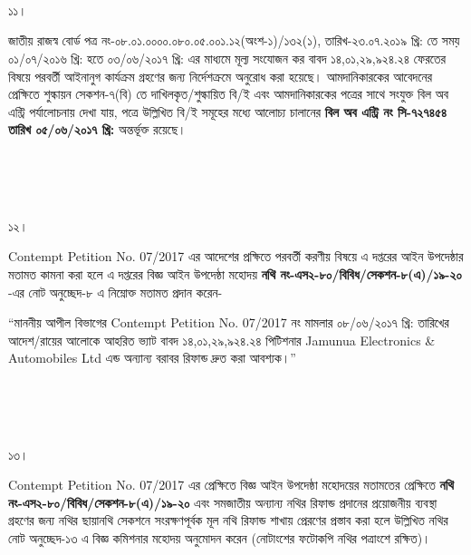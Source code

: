 \documentclass[12pt]{article}
\begin{document}
\\
\\
\\
\begin{minipage}[t]{0.05\linewidth}
১১।
\end{minipage}
\begin{minipage}[t]{1\linewidth}
জাতীয় রাজস্ব বোর্ড পত্র
নং-০৮.০১.০০০০.০৮০.০৫.০০১.১২(অংশ-১)/১৩২(১),
তারিখ-২৩.০৭.২০১৯ খ্রি:
তে সময়
০১/০৭/২০১৬ খ্রি: হতে ০৩/০৬/২০১৭ খ্রি:
এর মাধ্যমে মূল্য সংযোজন কর বাবদ
১৪,০১,২৯,৯২৪.২৪
ফেরতের বিষয়ে পরবর্তী
আইনানুগ কার্যক্রম গ্রহণের জন্য
নির্দেশক্রমে অনুরোধ করা হয়েছে।
আমদানিকারকের আবেদনের প্রেক্ষিতে শুল্কায়ন
সেকশন-৭(বি) তে দাখিলকৃত/শুল্কায়িত
বি/ই এবং আমদানিকারকের
পত্রের সাথে সংযুক্ত বিল অব এন্ট্রি
পর্যালোচনায় দেখা যায়,
পত্রে উল্লিখিত বি/ই সমূহের
মধ্যে আলোচ্য চালানের
\textbf{বিল অব এন্ট্রি নং সি-৭২৭৪৫৪ তারিখ ০৫/০৬/২০১৭ খ্রি:}
অন্তর্ভূক্ত রয়েছে।
\end{minipage}
\\
\\
\\
\begin{minipage}[t]{0.05\linewidth}
১২।
\end{minipage}
\begin{minipage}[t]{1\linewidth}
Contempt Petition No. 07/2017
এর আদেশের প্রক্ষিতে পরবর্তী
করণীয় বিষয়ে এ দপ্তরের আইন
উপদেষ্ঠার মতামত কামনা করা হলে এ দপ্তরের
বিজ্ঞ আইন উপদেষ্ঠা মহোদয়
\textbf{নথি নং-এস২-৮০/বিবিধ/সেকশন-৮(এ)/১৯-২০}
-এর নোট অনুচ্ছেদ-৮ এ নিম্নোক্ত মতামত প্রদান করেন-


\hspace{1em}``মাননীয় আপীল বিভাগের
Contempt Petition No. 07/2017
নং মামলার ০৮/০৬/২০১৭ খ্রি: তারিখের
আদেশ/রায়ের আলোকে আহরিত ভ্যাট বাবদ
১৪,০১,২৯,৯২৪.২৪
পিটিশনার
Jamunua Electronics \& Automobiles Ltd
এন্ড অন্যান্য বরাবর রিফান্ড
দ্রুত করা আবশ্যক।''
\end{minipage}
\\
\\
\\
\begin{minipage}[t]{0.05\linewidth}
১৩।
\end{minipage}
\begin{minipage}[t]{1\linewidth}
Contempt Petition No. 07/2017
এর প্রেক্ষিতে বিজ্ঞ আইন উপদেষ্ঠা মহোদয়ের
মতামতের প্রেক্ষিতে
\textbf{নথি নং-এস২-৮০/বিবিধ/সেকশন-৮(এ)/১৯-২০}
এবং সমজাতীয় অন্যান্য নথির
রিফান্ড প্রদানের প্রয়োজনীয় ব্যবস্থা গ্রহণের
জন্য নথির ছায়ানথি সেকশনে
সংরক্ষণপূর্বক মূল নথি রিফান্ড
শাখায় প্রেরণের প্রস্তাব করা হলে উল্লিখিত নথির
নোট অনুচ্ছেদ-১৩ এ বিজ্ঞ কমিশনার মহোদয় অনুমোদন
করেন (নোটাংশের ফটোকপি নথির পত্রাংশে রক্ষিত)।
\end{minipage}
\end{document}
